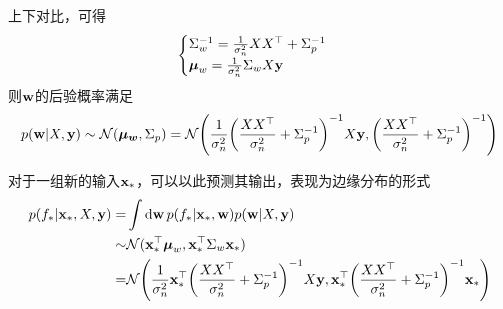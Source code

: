 \documentclass[12pt,UTF8]{article}
\begin{document}
            上下对比，可得
            \begin{equation}
                \begin{cases}
                    \Sigma_w^{-1}=\frac{1}{\sigma_n^2}XX^\top+\Sigma_p^{-1} \\
                    \vb*{\mu}_w=\frac{1}{\sigma_n^2}\Sigma_w X\vb{y}
                \end{cases}
            \end{equation}
            则$\vb{w}$的后验概率满足
            \begin{equation}
                p(\vb{w}|X,\vb{y})\sim\mathcal{N}(\vb*{\mu_w},\Sigma_p)=\mathcal{N}\qty(\frac{1}{\sigma_n^2}\qty(\frac{XX^\top}{\sigma_n^2}+\Sigma_p^{-1})^{-1}X\vb{y},\qty(\frac{XX^\top}{\sigma_n^2}+\Sigma_p^{-1})^{-1})
            \end{equation}\par
            对于一组新的输入$\vb{x}_*$，可以以此预测其输出，表现为边缘分布的形式
            \begin{align}
                p(f_*|\vb{x}_*,X,\vb{y})=&\int{\dd{\vb{w}}p(f_*|\vb{x}_*,\vb{w})p(\vb{w}|X,\vb{y})} \\
                \sim&\mathcal{N}(\vb{x}_*^\top\vb*{\mu}_w,\vb{x}_*^\top\Sigma_w\vb{x}_*) \\
                =&\mathcal{N}\qty(\frac{1}{\sigma_n^2}\vb{x}_*^\top\qty(\frac{XX^\top}{\sigma_n^2}+\Sigma_p^{-1})^{-1}X\vb{y},\vb{x}_*^\top\qty(\frac{XX^\top}{\sigma_n^2}+\Sigma_p^{-1})^{-1}\vb{x}_*)
            \end{align}
\end{document}
